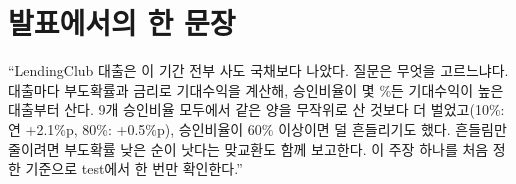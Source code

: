 \section{발표에서의 한 문장}
\begin{keybox}[한 문장]
``LendingClub 대출은 이 기간 전부 사도 국채보다 나았다. 질문은 무엇을 고르느냐다. 대출마다 부도확률과 금리로 기대수익을 계산해, 승인비율이 몇 \%든 기대수익이 높은 대출부터 산다. 9개 승인비율 모두에서 같은 양을 무작위로 산 것보다 더 벌었고(10\%: 연 +2.1\%p, 80\%: +0.5\%p), 승인비율이 60\% 이상이면 덜 흔들리기도 했다. 흔들림만 줄이려면 부도확률 낮은 순이 낫다는 맞교환도 함께 보고한다. 이 주장 하나를 처음 정한 기준으로 test에서 한 번만 확인한다.''
\end{keybox}
